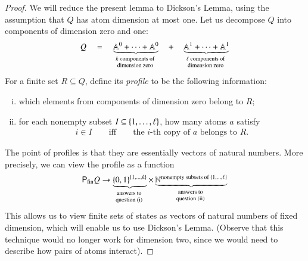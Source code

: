 \begin{proof}
 We will reduce the present lemma to Dickson's Lemma, using the assumption that $Q$ has atom dimension at most one. Let us decompose $Q$ into components of dimension zero and one:
    \begin{align*}
    Q \quad  = \quad 
     \myunderbrace{\atoms^0 + \cdots + \atoms^0}{$k$ components of \\  dimension zero} 
        \quad + \quad 
        \myunderbrace{\atoms^1 + \cdots + \atoms^1}{$\ell$ components of \\  dimension zero} 
    \end{align*}
    For a finite set $R \subseteq Q$, define its \emph{profile} to be the following information:
    \begin{enumerate}[i.]
        \item which elements  from components of dimension zero belong to $R$;
        \item  for each  nonempty subset $I \subseteq \{1,\ldots,\ell\}$, how many atoms  $a$ satisfy 
        \begin{align*}
            i \in I \qquad \text{iff} \qquad 
            \text{the $i$-th copy of $a$ belongs to $R$}.
        \end{align*}
    \end{enumerate}
    The point of profiles is that they are essentially vectors of natural numbers. More precisely, we  can view the profile as a function 
    \begin{align*}
    \pfin Q \to     \myunderbrace{\set{0,1}^{\set{1,\ldots,k}}}{answers to\\ question (i)} \times  \myunderbrace{\Nat^{\text{nonempty subsets of } \set{1,\ldots,\ell}}}{answers to\\ question (ii)}
    \end{align*}
    This allows us to view finite sets of states as vectors of natural numbers of fixed dimension, which will enable us to use Dickson's Lemma. (Observe that this technique would no longer work for dimension two, since we would need to describe how pairs of atoms interact).


\end{proof}
